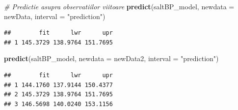 \documentclass[]{article}
\newenvironment{Shaded}{\begin{snugshade}}{\end{snugshade}}
\newcommand{\KeywordTok}[1]{\textcolor[rgb]{0.13,0.29,0.53}{\textbf{{#1}}}}
\newcommand{\DataTypeTok}[1]{\textcolor[rgb]{0.13,0.29,0.53}{{#1}}}
\newcommand{\StringTok}[1]{\textcolor[rgb]{0.31,0.60,0.02}{{#1}}}
\newcommand{\CommentTok}[1]{\textcolor[rgb]{0.56,0.35,0.01}{\textit{{#1}}}}
\newcommand{\NormalTok}[1]{{#1}}
\begin{document}
\begin{Shaded}
\begin{Highlighting}[]
\CommentTok{# Predictie asupra observatiilor viitoare}
\KeywordTok{predict}\NormalTok{(saltBP_model, }\DataTypeTok{newdata =} \NormalTok{newData, }\DataTypeTok{interval =} \StringTok{"prediction"}\NormalTok{)}
\end{Highlighting}
\end{Shaded}

\begin{verbatim}
##        fit      lwr      upr
## 1 145.3729 138.9764 151.7695
\end{verbatim}

\begin{Shaded}
\begin{Highlighting}[]
\KeywordTok{predict}\NormalTok{(saltBP_model, }\DataTypeTok{newdata =} \NormalTok{newData2, }\DataTypeTok{interval =} \StringTok{"prediction"}\NormalTok{)}
\end{Highlighting}
\end{Shaded}

\begin{verbatim}
##        fit      lwr      upr
## 1 144.1760 137.9144 150.4377
## 2 145.3729 138.9764 151.7695
## 3 146.5698 140.0240 153.1156
\end{verbatim}
\end{document}
